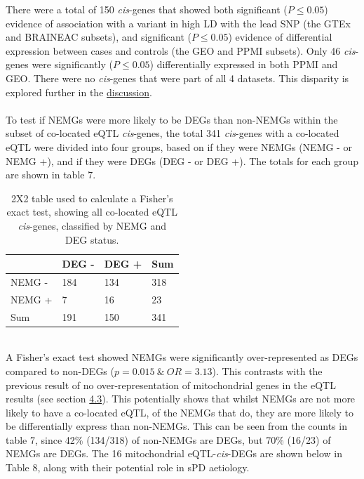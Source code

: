 \documentclass{article}
\begin{document}
\newpage
There were a total of 150 \textit{cis}-genes that showed both significant ($P \leq 0.05$) evidence of association with a variant in high LD with the lead SNP (the GTEx and BRAINEAC subsets), and significant ($P \leq 0.05$) evidence of differential expression between cases and controls (the GEO and PPMI subsets). Only 46 \textit{cis}-genes were significantly ($P \leq 0.05$) differentially expressed in both PPMI and GEO. There were no \textit{cis}-genes that were part of all 4 datasets. This disparity is explored further in the \hyperref[subsec:studydesign]{discussion}.
\\
\\To test if NEMGs were more likely to be DEGs than non-NEMGs within the subset of co-located eQTL \textit{cis}-genes, the total 341 \textit{cis}-genes with a co-located eQTL were divided into four groups, based on if they were NEMGs (NEMG - or NEMG +), and if they were DEGs (DEG - or DEG +). The totals for each group are shown in table 7.
\begin{table}[h]
    \centering
    \caption{2X2 table used to calculate a Fisher's exact test, showing all co-located eQTL \textit{cis}-genes, classified by NEMG and DEG status.}
    \begin{tabular}{|l|l|l|l|}
        \hline
                        & DEG - & DEG + & Sum \\ \hline
        NEMG - &  184   & 134   & 318  \\ \hline
        NEMG + &  7  & 16   & 23 \\ \hline
        Sum             & 191   & 150   & 341 \\ \hline
    \end{tabular}
\end{table}
\\A Fisher's exact test showed NEMGs were significantly over-represented as DEGs compared to non-DEGs ($p = 0.015\ \&\ OR = 3.13$). This contrasts with the previous result of no over-representation of mitochondrial genes in the eQTL results (see section \hyperref[fisher1]{4.3}). This potentially shows that whilst NEMGs are not more likely to have a co-located eQTL, of the NEMGs that do, they are more likely to be differentially express than non-NEMGs. This can be seen from the counts in table 7, since 42\% (134/318) of non-NEMGs are DEGs, but 70\% (16/23) of NEMGs are DEGs. The 16 mitochondrial eQTL-\textit{cis}-DEGs are shown below in Table 8, along with their potential role in sPD aetiology.
\end{document}
